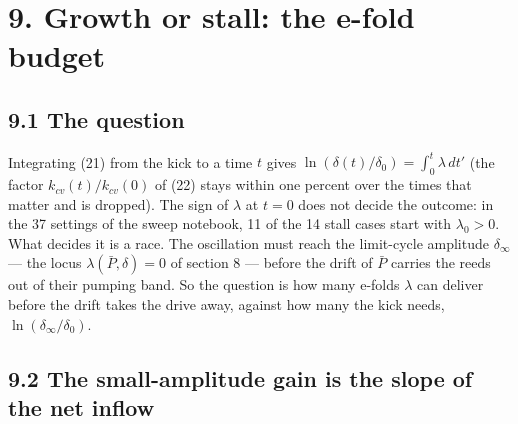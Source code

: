\section*{9. Growth or stall: the e-fold budget}

\subsection*{9.1 The question}

Integrating (21) from the kick to a time $t$ gives $\ln\left(\delta(t)/\delta_0\right) = \int_0^t \lambda\,dt'$ (the factor $k_{cv}(t)/k_{cv}(0)$ of (22) stays within one percent over the times that matter and is dropped). The sign of $\lambda$ at $t = 0$ does not decide the outcome: in the 37 settings of the sweep notebook, 11 of the 14 stall cases start with $\lambda_0 > 0$. What decides it is a race. The oscillation must reach the limit-cycle amplitude $\delta_\infty$ --- the locus $\lambda(\bar P, \delta) = 0$ of section 8 --- before the drift of $\bar P$ carries the reeds out of their pumping band. So the question is how many e-folds $\lambda$ can deliver before the drift takes the drive away, against how many the kick needs, $\ln(\delta_\infty/\delta_0)$.

\subsection*{9.2 The small-amplitude gain is the slope of the net inflow}

